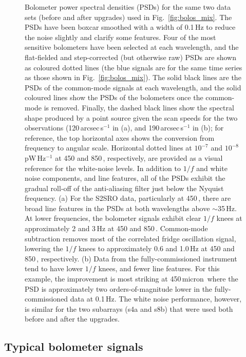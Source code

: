 \documentclass[useAMS,usenatbib,nofootinbib]{mn2e}
\begin{document}
\begin{figure}
\caption{Bolometer power spectral densities (PSDs) for the same two
  data sets (before and after upgrades) used in
  Fig.~\ref{fig:bolos_mix}. The PSDs have been boxcar smoothed with a
  width of 0.1\,Hz to reduce the noise slightly and clarify some
  features. Four of the most sensitive bolometers have been selected
  at each wavelength, and the flat-fielded and step-corrected (but
  otherwise raw) PSDs are shown as coloured dotted lines (the blue
  signals are for the same time series as those shown in
  Fig.~\ref{fig:bolos_mix}).  The solid black lines are the PSDs of
  the common-mode signals at each wavelength, and the solid coloured
  lines show the PSDs of the bolometers once the common-mode is
  removed.  Finally, the dashed black lines show the spectral shape
  produced by a point source given the scan speeds for the two
  observations (120\,arcsec\,s$^{-1}$ in (a), and
  190\,arcsec\,s$^{-1}$ in (b); for reference, the top horizontal axes
  shows the conversion from frequency to angular scale. Horizontal
  dotted lines at $10^{-7}$ and $10^{-8}$\,pW\,Hz$^{-1}$ at 450 and
  850\,\micron, respectively, are provided as a visual reference for
  the white-noise levels. In addition to $1/f$ and white noise
  components, and line features, all of the PSDs exhibit the gradual
  roll-off of the anti-aliasing filter just below the Nyquist
  frequency.  (a) For the S2SRO data, particularly at 450\,\micron,
  there are broad line features in the PSDs at both wavelengths above
  $\sim$35\,Hz.  At lower frequencies, the bolometer signals exhibit
  clear $1/f$ knees at approximately 2 and 3\,Hz at 450 and
  850\,\micron. Common-mode subtraction removes most of the correlated
  fridge oscillation signal, lowering the $1/f$ knees to approximately
  0.6 and 1.0\,Hz at 450 and 850\,\micron, respectively. (b) Data from
  the fully-commissioned instrument tend to have lower $1/f$ knees,
  and fewer line features. For this example, the improvement is most
  striking at 450\,micron\ where the PSD is approximately two
  orders-of-magnitude lower in the fully-commissioned data at
  0.1\,Hz. The white noise performance, however, is similar for the
  two subarrays (s4a and s8b) that were used both before and after the
  upgrades.}
\label{fig:pspec}
\end{figure}


\subsection{Typical bolometer signals}
\label{sec:bolosignal}
\end{document}
